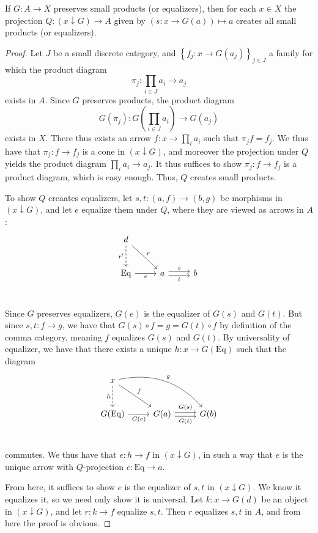 \begin{lemma}\label{lma:5.1}
	If $G : A \to X$ preserves small products (or equalizers), then for each $x\in X$ the projection $Q : (x\downarrow G) \to A$ given by $(s : x \to G(a))\mapsto a$ creates all small products (or equalizers).
\end{lemma}
\begin{proof}
	Let $J$ be a small discrete category, and $\left\{ f_j : x \to G(a_j) \right\}_{j\in J} $ a family for which the product diagram
	\[
		\pi_j : \prod_{i\in J} a_i \to a_j
	\]
	exists in $A$. Since $G$ preserves products, the product diagram
	\[
		G(\pi_j): G\left( \prod_{i\in J} a_i \right)  \to G(a_j)
	\]
	exists in $X$. There thus exists an arrow $f : x \to \prod_{i} a_i$ such that $\pi_j f=f_j$. We thus have that $\pi_j : f \to f_j$ is a cone in $(x\downarrow G)$, and moreover the projection under $Q$ yields the product diagram $\prod_{i} a_i \to a_j$. It thus suffices to show $\pi_j : f \to f_j$ is a product diagram, which is easy enough. Thus, $Q$ creates small products.

	To show $Q$ creaates equalizers, let $s,t : (a,f) \to (b,g)$ be morphisms in $(x\downarrow G)$, and let $e$ equalize them under $Q$, where they are viewed as arrows in $A$:
	\[\begin{tikzcd}[row sep = 2.5em, column sep = 2.5em]
	d\ar[" r ", dr] \ar[" r' "', dashed, d]  &  &  \\
	\mathrm{Eq} \ar[" e "', r]  & a \ar[" s ", shift left, r] \ar[" t "', shift right, r]  & b \\
	\end{tikzcd}\]
	Since $G$ preserves equalizers, $G(e)$ is the equalizer of $G(s)$ and $G(t)$. But since $s,t : f \to g$, we have that $G(s)\circ f=g=G(t)\circ f$ by definition of the comma category, meaning $f$ equalizes $G(s)$ and $G(t)$. By universality of equalizer, we have that there exists a unique $h : x \to G(\mathrm{Eq} )$ such that the diagram
	\[\begin{tikzcd}[row sep = 2.5em, column sep = 2.5em]
	x\ar[" f ", dr] \ar[" h "', dashed, d]\ar[" g ", bend left, drr]  &  &  \\
	G(\mathrm{Eq}) \ar[" G(e) "', r]  & G(a) \ar[" G(s) ", shift left, r] \ar[" G(t) "', shift right, r]  & G(b) \\
	\end{tikzcd}\]
	commutes. We thus have that $e : h \to f$ in $(x\downarrow G)$, in such a way that $e$ is the unique arrow with $Q$-projection $e : \mathrm{Eq}  \to a$.

	From here, it suffices to show $e$ is the equalizer of $s,t$ in $(x\downarrow G)$. We know it equalizes it, so we need only show it is universal. Let $k : x \to G(d)$ be an object in $(x\downarrow G)$, and let $r : k \to f$ equalize $s,t$. Then $r$ equalizes $s,t$ in $A$, and from here the proof is obvious.
\end{proof}

